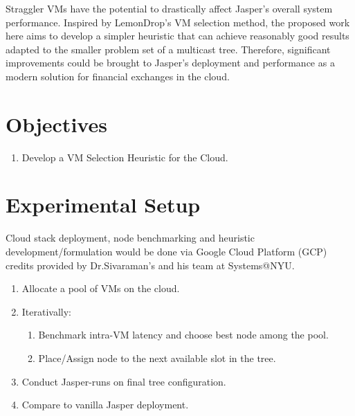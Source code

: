 \documentclass{article}
\begin{document}
Straggler VMs have the potential to drastically affect Jasper's overall system performance.
Inspired by LemonDrop's VM selection method, the proposed work here aims to develop a simpler heuristic that 
can achieve reasonably good results adapted to the smaller problem set of a multicast tree. 
Therefore, significant improvements could be brought to Jasper's deployment and performance as a 
modern solution for financial exchanges in the cloud.

\section{Objectives}
\begin{enumerate}
    \item Develop a VM Selection Heuristic for the Cloud.
\end{enumerate}

\section{Experimental Setup}
Cloud stack deployment, node benchmarking and heuristic development/formulation would be done 
via Google Cloud Platform (GCP) credits provided by Dr.Sivaraman's and his team at Systems@NYU.

\begin{enumerate}
    \item Allocate a pool of VMs on the cloud.
    \item Iterativally:
    \begin{enumerate}
        \item Benchmark intra-VM latency and choose best node among the pool.
        \item Place/Assign node to the next available slot in the tree.
    \end{enumerate}
    \item Conduct Jasper-runs on final tree configuration.
    \item Compare to vanilla Jasper deployment.
\end{enumerate}


    

 
    
\end{document}

